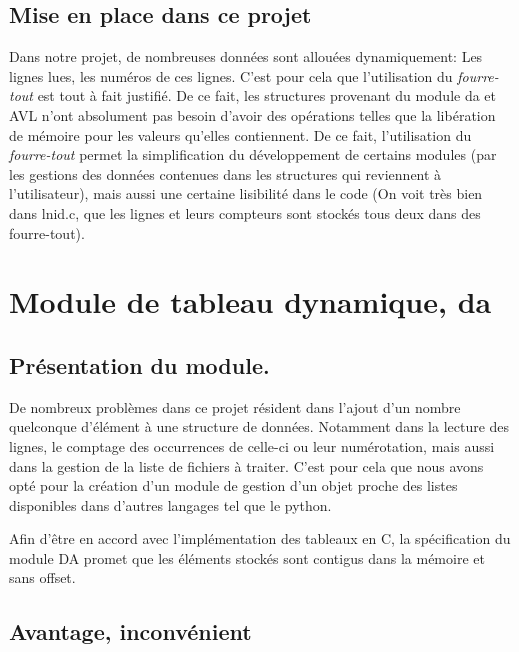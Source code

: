 \documentclass[12pt]{article}
\begin{document}
    \subsection{Mise en place dans ce projet}

    Dans notre projet, de nombreuses données sont allouées dynamiquement\@: Les 
    lignes lues, les numéros de ces lignes. C'est pour cela que l'utilisation du 
    \textit{fourre-tout} est tout à fait justifié. De ce fait, les structures 
    provenant du module da et AVL n'ont absolument pas besoin d'avoir des
    opérations telles que la libération de mémoire pour les valeurs qu'elles 
    contiennent. De ce fait, l'utilisation du \textit{fourre-tout} permet la 
    simplification du développement de certains modules (par les gestions des 
    données contenues dans les structures qui reviennent à l'utilisateur), mais 
    aussi une certaine lisibilité dans le code (On voit très bien dans lnid.c,
    que les lignes et leurs compteurs sont stockés tous deux dans des 
    fourre-tout).

    \newpage

    \section{Module de tableau dynamique, da}

    \subsection{Présentation du module.}

    De nombreux problèmes dans ce projet résident dans l'ajout d'un nombre 
    quelconque d'élément à une structure de données. Notamment dans la 
    lecture des lignes, le comptage des occurrences de celle-ci ou leur 
    numérotation, mais aussi dans la gestion de la liste de fichiers à 
    traiter. C'est pour cela que nous avons opté pour la création d'un 
    module de gestion d'un objet proche des listes disponibles dans d'autres 
    langages tel que le python. 

    Afin d'être en accord avec l'implémentation des tableaux en C, la 
    spécification du module DA promet que les éléments stockés sont 
    contigus dans la mémoire et sans offset.
    
    \subsection{Avantage, inconvénient}
\end{document}
